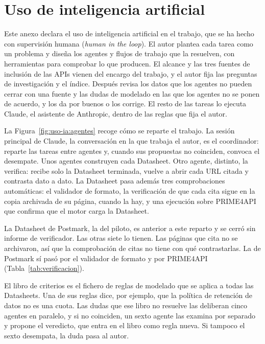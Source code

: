 \chapter{Uso de inteligencia artificial}
\label{anx:uso-ia}

Este anexo declara el uso de inteligencia artificial en el trabajo, que se ha hecho con supervisión humana (\textit{human in the loop}). El autor plantea cada tarea como un problema y diseña los agentes y flujos de trabajo que la resuelven, con herramientas para comprobar lo que producen. El alcance y las tres fuentes de inclusión de las APIs vienen del encargo del trabajo, y el autor fija las preguntas de investigación y el índice.
Después revisa los datos que los agentes no pueden cerrar con una fuente y las dudas de modelado en las que los agentes no se ponen de acuerdo, y los da por buenos o los corrige. El resto de las tareas lo ejecuta Claude, el asistente de Anthropic, dentro de las reglas que fija el autor.

La Figura~\ref{fig:uso-ia:agentes} recoge cómo se reparte el trabajo.
La sesión principal de Claude, la conversación en la que trabaja el autor, es el coordinador: reparte las tareas entre agentes y, cuando sus propuestas no coinciden, convoca el desempate.
Unos agentes construyen cada Datasheet.
Otro agente, distinto, la verifica: recibe solo la Datasheet terminada, vuelve a abrir cada URL citada y contrasta dato a dato.
La Datasheet pasa además tres comprobaciones automáticas: el validador de formato, la verificación de que cada cita sigue en la copia archivada de su página, cuando la hay, y una ejecución sobre PRIME4API que confirma que el motor carga la Datasheet.

La Datasheet de Postmark, la del piloto, es anterior a este reparto y se cerró sin informe de verificador.
Las otras siete lo tienen.
Las páginas que cita no se archivaron, así que la comprobación de citas no tiene con qué contrastarlas.
La de Postmark sí pasó por el validador de formato y por PRIME4API (Tabla~\ref{tab:verificacion}).

El libro de criterios es el fichero de reglas de modelado que se aplica a todas las Datasheets.
Una de sus reglas dice, por ejemplo, que la política de retención de datos no es una cuota.
Las dudas que ese libro no resuelve las deliberan cinco agentes en paralelo, y si no coinciden, un sexto agente las examina por separado y propone el veredicto, que entra en el libro como regla nueva.
Si tampoco el sexto desempata, la duda pasa al autor.

